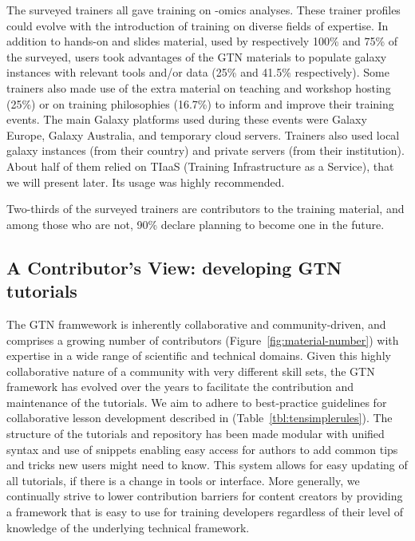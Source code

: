 \documentclass[10pt,letterpaper]{article}
\begin{document}
The surveyed trainers all gave training on -omics analyses.
These trainer profiles could evolve with the introduction of training on diverse fields of expertise. In addition to hands-on and slides material, used by respectively 100\% and 75\% of the surveyed, users took advantages of the GTN materials to populate galaxy instances with relevant tools and/or data (25\% and 41.5\% respectively).
Some trainers also made use of the extra material on teaching and workshop hosting (25\%) or on training philosophies (16.7\%) to inform and improve their training events.
The main Galaxy platforms used during these events were Galaxy Europe, Galaxy  Australia, and temporary cloud servers. Trainers also used local galaxy instances (from their country) and  private servers (from their institution).
About half of them relied on TIaaS (Training Infrastructure as a Service), that we will present later. Its usage was highly recommended.

Two-thirds of the surveyed trainers are contributors to the training material, and among those who are not, 90\% declare planning to become one in the future.

\subsection*{A Contributor's View: developing GTN tutorials}

The GTN framwework is inherently collaborative and community-driven, and comprises a growing number of contributors (Figure~\ref{fig:material-number})  with expertise in a wide range of scientific and technical domains. Given this highly collaborative nature of a community with very different skill sets, the GTN framework has evolved over the years to facilitate the contribution and maintenance of the tutorials. We aim to adhere to best-practice guidelines for collaborative lesson development described in \cite{Devenyi_2018} (Table~\ref{tbl:tensimplerules}). The structure of the tutorials and repository has been made modular with unified syntax and use of snippets enabling easy access for authors to add common tips and tricks new users might need to know. This system allows for easy updating of all tutorials, if there is a change in tools or interface. More generally, we continually strive to lower contribution barriers for content creators by providing a framework that is easy to use for training developers regardless of their level of knowledge of the underlying technical framework.
\end{document}
